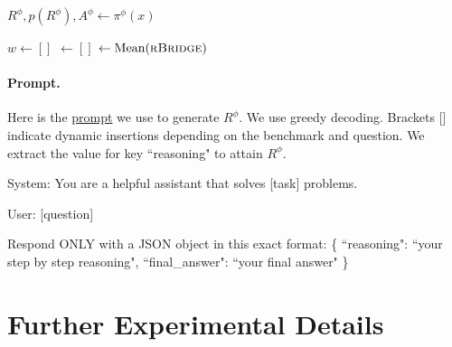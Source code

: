\begin{algorithm2e}[H]
    \caption{}
    \label{alg:rbridge}
     $R^\phi, p(R^\phi) ,A^\phi \leftarrow \pi^\phi(x)$ \;

    $w \leftarrow []$\;
     $\leftarrow []$\;
     $\leftarrow \text{Mean}(\textsc{rBridge})$\;
\end{algorithm2e}


\paragraph{Prompt.} Here is the \hyperlink{prompt}{prompt} we use to generate $R^\phi$. We use greedy decoding. Brackets [] indicate dynamic insertions depending on the benchmark and question. We extract the value for key ``reasoning" to attain $R^\phi$.

\hypertarget{prompt}{}
\begin{tcolorbox}[colback=gray!5!white, colframe=gray!75!black, title=Prompt to Frontier Model, label={box:mailman_question}]

System: You are a helpful assistant that solves [task] problems.

\vspace{1em}

User: [question]

Respond ONLY with a JSON object in this exact format:
\{ ``reasoning": ``your step by step reasoning", ``final\_answer": ``your final answer" \}

\end{tcolorbox}

\section{Further Experimental Details} \label{app:setting}

